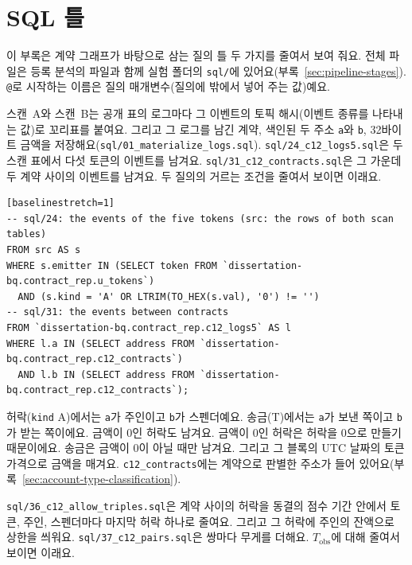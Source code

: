 \section{SQL 틀}
\label{ch:appendix-sql}

이 부록은 계약 그래프가 바탕으로 삼는 질의 틀 두 가지를 줄여서 보여 줘요. 전체 파일은 등록 분석의 파일과 함께 실험 폴더의 \texttt{sql/}에 있어요(부록~\ref{sec:pipeline-stages}). \texttt{@}로 시작하는 이름은 질의 매개변수(질의에 밖에서 넣어 주는 값)예요.


스캔~A와 스캔~B는 공개 표의 로그마다 그 이벤트의 토픽 해시(이벤트 종류를 나타내는 값)로 꼬리표를 붙여요. 그리고 그 로그를 남긴 계약, 색인된 두 주소 \texttt{a}와 \texttt{b}, 32바이트 금액을 저장해요(\texttt{sql/01\_materialize\_logs.sql}). \texttt{sql/24\_c12\_logs5.sql}은 두 스캔 표에서 다섯 토큰의 이벤트를 남겨요. \texttt{sql/31\_c12\_contracts.sql}은 그 가운데 두 계약 사이의 이벤트를 남겨요. 두 질의의 거르는 조건을 줄여서 보이면 이래요.

\begin{verbatim}[baselinestretch=1]
-- sql/24: the events of the five tokens (src: the rows of both scan tables)
FROM src AS s
WHERE s.emitter IN (SELECT token FROM `dissertation-bq.contract_rep.u_tokens`)
  AND (s.kind = 'A' OR LTRIM(TO_HEX(s.val), '0') != '')
-- sql/31: the events between contracts
FROM `dissertation-bq.contract_rep.c12_logs5` AS l
WHERE l.a IN (SELECT address FROM `dissertation-bq.contract_rep.c12_contracts`)
  AND l.b IN (SELECT address FROM `dissertation-bq.contract_rep.c12_contracts`);
\end{verbatim}

허락(\texttt{kind} A)에서는 \texttt{a}가 주인이고 \texttt{b}가 스펜더예요. 송금(T)에서는 \texttt{a}가 보낸 쪽이고 \texttt{b}가 받는 쪽이에요. 금액이 0인 허락도 남겨요. 금액이 0인 허락은 허락을 0으로 만들기 때문이에요. 송금은 금액이 0이 아닐 때만 남겨요. 그리고 그 블록의 UTC 날짜의 토큰 가격으로 금액을 매겨요. \texttt{c12\_contracts}에는 계약으로 판별한 주소가 들어 있어요(부록~\ref{sec:account-type-classification}).


\texttt{sql/36\_c12\_allow\_triples.sql}은 계약 사이의 허락을 동결의 점수 기간 안에서 토큰, 주인, 스펜더마다 마지막 허락 하나로 줄여요. 그리고 그 허락에 주인의 잔액으로 상한을 씌워요. \texttt{sql/37\_c12\_pairs.sql}은 쌍마다 무게를 더해요. $T_{\mathrm{obs}}$에 대해 줄여서 보이면 이래요.

